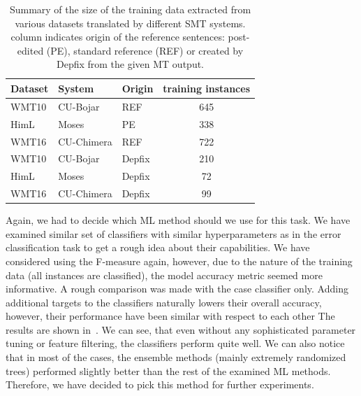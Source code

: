 \begin{table}[t]
\centering
\small

\begin{tabular}{lll|c}
Dataset  &  System  &  Origin  &  \hash{} training instances  \\
\hline
WMT10  &  CU-Bojar  &  REF  &  645  \\
HimL  &   Moses  &  PE  & 338  \\
WMT16  &  CU-Chimera  &  REF  &  722  \\
WMT10  &  CU-Bojar  &  Depfix  &  210  \\
HimL  &  Moses  &  Depfix  &  72  \\
WMT16  &  CU-Chimera  &  Depfix  &  99  \\
\end{tabular}
\caption[Summary of the extracted Czech training data for morphological prediction]{
    Summary of the size of the training data extracted from various datasets translated by different SMT systems.
	 column indicates origin
	of the reference sentences: post-edited (PE), standard reference (REF) or created by Depfix from the given MT output.
}
\label{cats-training-sum}
\end{table}

Again, we had to decide which ML method should we use for this task. 
We have examined similar set of classifiers with similar
hyperparameters as in the error classification task to get a rough idea about their capabilities.
We have considered using the F-measure again, however, due to the nature of the training data (all
instances are classified), the model accuracy metric seemed more informative.
A rough comparison was made with the case classifier only.
Adding additional targets to the classifiers naturally lowers their overall accuracy,
however, their performance have been similar with respect to each other
The results are shown in~. We can see, that even without any sophisticated parameter
tuning or feature filtering, the classifiers perform quite well. We can also notice that in most of the cases, the ensemble
methods (mainly extremely randomized trees) performed slightly better than the rest of the examined ML methods. Therefore, we have decided
to pick this method for further experiments.

